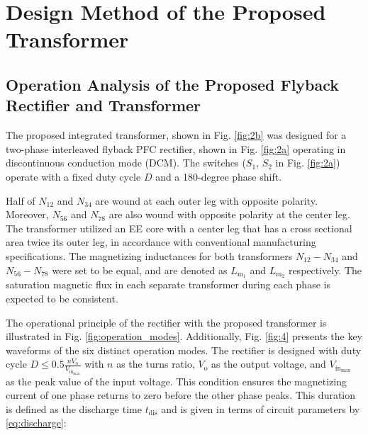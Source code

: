 \documentclass[lettersize,journal]{IEEEtran}
\begin{document}
\section{Design Method of the Proposed Transformer}

\subsection{Operation Analysis of the Proposed Flyback Rectifier and Transformer}
The proposed integrated transformer, shown in Fig. \ref{fig:2b} was designed for a two-phase interleaved flyback PFC rectifier, shown in Fig. \ref{fig:2a} operating in discontinuous conduction mode (DCM). The switches ($S_1$, $S_2$ in Fig. \ref{fig:2a}) operate with a fixed duty cycle $D$ and a 180-degree phase shift.

Half of $N_{12}$ and $N_{34}$ are wound at each outer leg with opposite polarity. Moreover, $N_{56}$ and $N_{78}$ are also wound with opposite polarity at the center leg. The transformer utilized an EE core with a center leg that has a cross sectional area twice its outer leg, in accordance with conventional manufacturing specifications. The magnetizing inductances for both transformers $N_{12}-N_{34}$ and $N_{56}-N_{78}$ were set to be equal, and are denoted as $L_{\mathrm{m}_1}$ and $L_{\mathrm{m}_2}$ respectively. The saturation magnetic flux in each separate transformer during each phase is expected to be consistent.

The operational principle of the rectifier with the proposed transformer is illustrated in Fig. \ref{fig:operation_modes}. Additionally, Fig. \ref{fig:4} presents the key waveforms of the six distinct operation modes. The rectifier is designed with duty cycle $D \le 0.5 \frac{n V_{\mathrm{o}}}{V_{\mathrm{in}_{\mathrm{max}}}}$ with $n$ as the turns ratio, $V_{\mathrm{o}}$ as the output voltage, and $V_{\mathrm{in}_{\mathrm{max}}}$ as the peak value of the input voltage. This condition ensures the magnetizing current of one phase returns to zero before the other phase peaks. This duration is defined as the discharge time $t_{\mathrm{dis}}$ and is given in terms of circuit parameters by \eqref{eq:discharge}:
\end{document}

